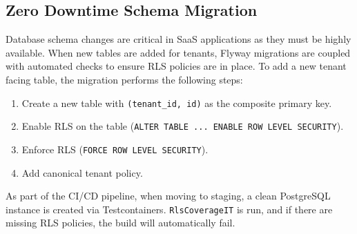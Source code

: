 \documentclass[conference]{IEEEtran}
\begin{document}
\begin{table}[t]
\renewcommand{\arraystretch}{0.95}
\caption{Developer Experience and Maintenance Comparison}
\label{tab:devex}
\centering
\scriptsize
\setlength{\tabcolsep}{2.5pt}
\end{table}

\clearpage
\subsection{Zero Downtime Schema Migration}
Database schema changes are critical in SaaS applications as they must be highly available. When new tables are added for tenants, Flyway migrations are coupled with automated checks to ensure RLS policies are in place. To add a new tenant facing table, the migration performs the following steps:
\begin{enumerate}
\item Create a new table with \texttt{(tenant\_id, id)} as the composite primary key.
\item Enable RLS on the table (\texttt{ALTER TABLE ... ENABLE ROW LEVEL SECURITY}).
\item Enforce RLS (\texttt{FORCE ROW LEVEL SECURITY}).
\item Add canonical tenant policy.
\end{enumerate}
As part of the CI/CD pipeline, when moving to staging, a clean PostgreSQL instance is created via Testcontainers. \texttt{RlsCoverageIT} is run, and if there are missing RLS policies, the build will automatically fail.
\end{document}
